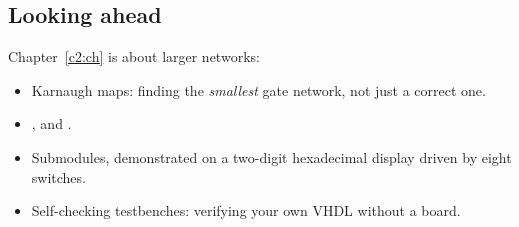\subsection*{Looking ahead}
Chapter~\ref{c2:ch} is about larger networks:
\begin{itemize}
  \item Karnaugh maps: finding the \emph{smallest} gate network, not just a correct one.
  \item {},  and .
  \item Submodules, demonstrated on a two-digit hexadecimal display driven by eight switches.
  \item Self-checking testbenches: verifying your own VHDL without a board.
\end{itemize}
